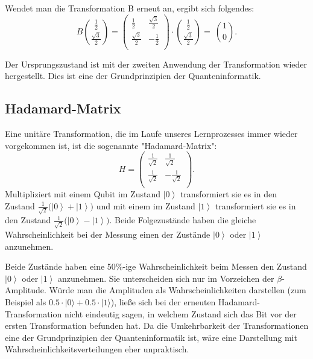 Wendet man die Transformation B erneut an, ergibt sich folgendes:
$$B\binom{\frac{1}{2}}{\frac{\sqrt3}{2}}=\left(\begin{matrix}\frac{1}{2}&\frac{\sqrt3}{2}\\\frac{\sqrt3}{2}&-\frac{1}{2}\\\end{matrix}\right)\cdot\binom{\frac{1}{2}}{\frac{\sqrt3}{2}}=\ \binom{1}{0}.$$

Der Ursprungszustand ist mit der zweiten Anwendung der Transformation wieder hergestellt. Dies ist eine der Grundprinzipien der Quanteninformatik.

\subsection{Hadamard-Matrix}

Eine unitäre Transformation, die im Laufe unseres Lernprozesses immer wieder vorgekommen ist, ist die sogenannte "Hadamard-Matrix": $$H=\left(\begin{matrix}\frac{1}{\sqrt2}&\frac{1}{\sqrt2}\\\frac{1}{\sqrt2}&-\frac{1}{\sqrt2}\\\end{matrix}\right).$$ Multipliziert mit einem Qubit im Zustand $\left|0\right\rangle$ transformiert sie es in den Zustand $\frac{1}{\sqrt2}(\left|\left.0\right\rangle+\right.\left|\left.1\right\rangle)\right.$ und mit einem im Zustand $\left|1\right\rangle$ transformiert sie es in den Zustand $\frac{1}{\sqrt2}(\left|\left.0\right\rangle-\right.\left|\left.1\right\rangle)\right.$. Beide Folgezustände haben die gleiche Wahrscheinlichkeit bei der Messung einen der Zustände $\left|0\right\rangle$ oder $\left|1\right\rangle$ anzunehmen. \\

\begin{tcolorbox}[title=Kommentar,
    title filled=false,
    colback=cyan!5!white,
    colframe=cyan!75!black]
Beide Zustände haben eine 50\%-ige Wahrscheinlichkeit beim Messen den Zustand $\left|0\right\rangle$ oder $\left|1\right\rangle$ anzunehmen. Sie unterscheiden sich nur im Vorzeichen der $\beta$-Amplitude. Würde man die Amplituden als Wahrscheinlichkeiten darstellen (zum Beispiel als $0.5\cdot\left|0\right.\rangle+0.5\cdot\left|1\right.\rangle$), ließe sich bei der erneuten Hadamard-Transformation nicht eindeutig sagen, in welchem Zustand sich das Bit vor der ersten Transformation befunden hat. Da die Umkehrbarkeit der Transformationen eine der Grundprinzipien der Quanteninformatik ist, wäre eine Darstellung mit Wahrscheinlichkeitsverteilungen eher unpraktisch.
\end{tcolorbox}

